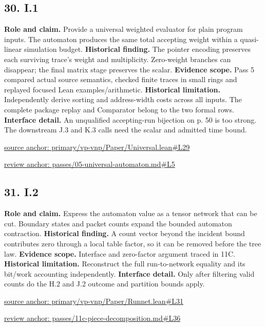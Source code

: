 \documentclass[11pt,letterpaper]{article}
\theoremstyle{definition}\newtheorem{definition}[theorem]{Definition}\newtheorem{example}[theorem]{Example}
\theoremstyle{remark}\newtheorem{remark}[theorem]{Remark}
\begin{document}
\subsection*{30. I.1}
\textbf{Role and claim.} Provide a universal weighted evaluator for plain program inputs. The automaton produces the same total accepting weight within a quasi-linear simulation budget.
\textbf{Historical finding.} The pointer encoding preserves each surviving trace's weight and multiplicity. Zero-weight branches can disappear; the final matrix stage preserves the scalar.
\textbf{Evidence scope.} Pass 5 compared actual source semantics, checked finite traces in small rings and replayed focused Lean examples/arithmetic.
\textbf{Historical limitation.} Independently derive sorting and address-width costs across all inputs. The complete package replay and Comparator belong to the two formal rows.
\textbf{Interface detail.} An unqualified accepting-run bijection on p. 50 is too strong. The downstream J.3 and K.3 calls need the scalar and admitted time bound.
\par\href{https://github.com/nousentllc/VP-VNP-Review/blob/8a7976933b6b2b4ffda1ad3a0dfb5fc6b6f023e8/primary/vp-vnp/Paper/Universal.lean\#L29}{source anchor: primary/vp-vnp/Paper/Universal.lean\#L29}
\par\href{https://github.com/nousentllc/VP-VNP-Review/blob/8a7976933b6b2b4ffda1ad3a0dfb5fc6b6f023e8/passes/05-universal-automaton.md\#L5}{review anchor: passes/05-universal-automaton.md\#L5}
\goodbreak
{}
\hypertarget{claim.31}{}
\subsection*{31. I.2}
\textbf{Role and claim.} Express the automaton value as a tensor network that can be cut. Boundary states and packet counts expand the bounded automaton contraction.
\textbf{Historical finding.} A count vector beyond the incident bound contributes zero through a local table factor, so it can be removed before the tree law.
\textbf{Evidence scope.} Interface and zero-factor argument traced in 11C.
\textbf{Historical limitation.} Reconstruct the full run-to-network equality and its bit/work accounting independently.
\textbf{Interface detail.} Only after filtering valid counts do the H.2 and J.2 outcome and partition bounds apply.
\par\href{https://github.com/nousentllc/VP-VNP-Review/blob/8a7976933b6b2b4ffda1ad3a0dfb5fc6b6f023e8/primary/vp-vnp/Paper/Runnet.lean\#L31}{source anchor: primary/vp-vnp/Paper/Runnet.lean\#L31}
\par\href{https://github.com/nousentllc/VP-VNP-Review/blob/8a7976933b6b2b4ffda1ad3a0dfb5fc6b6f023e8/passes/11c-piece-decomposition.md\#L36}{review anchor: passes/11c-piece-decomposition.md\#L36}
\goodbreak
{}
\hypertarget{claim.32}{}
\end{document}
